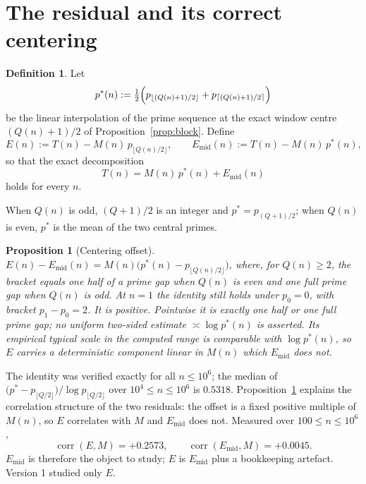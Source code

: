 \documentclass[11pt]{amsart}
\numberwithin{equation}{section}
\theoremstyle{plain}
\newtheorem{proposition}[theorem]{Proposition}
\theoremstyle{definition}
\newtheorem{definition}[theorem]{Definition}
\theoremstyle{remark}
\newcommand{\Mert}{M}
\newcommand{\Sq}{Q}
\begin{document}
\section{The residual and its correct centering}
\label{sec:centering}

\begin{definition}
\label{def:residuals}
Let
\begin{equation}
\label{eq:pstar-definition}
p^{*}(n):=\tfrac12\Bigl(p_{\lfloor (\Sq(n)+1)/2\rfloor}+p_{\lceil (\Sq(n)+1)/2\rceil}\Bigr)
\end{equation}
be the linear interpolation of the prime sequence at the exact window centre
$(\Sq(n)+1)/2$ of Proposition~\ref{prop:block}. Define
\begin{equation}
\label{eq:residual-definitions}
E(n):=T(n)-\Mert(n)\,p_{\lfloor \Sq(n)/2\rfloor},
\qquad
E_{\mathrm{mid}}(n):=T(n)-\Mert(n)\,p^{*}(n),
\end{equation}
so that the exact decomposition
\begin{equation}
\label{eq:centered-decomposition}
\boxed{\;T(n)=\Mert(n)\,p^{*}(n)+E_{\mathrm{mid}}(n)\;}
\end{equation}
holds for every $n$.
\end{definition}

When $\Sq(n)$ is odd, $(\Sq+1)/2$ is an integer and $p^{*}=p_{(\Sq+1)/2}$; when
$\Sq(n)$ is even, $p^{*}$ is the mean of the two central primes.

\begin{proposition}[Centering offset]\label{prop:offset}
$E(n)-E_{\mathrm{mid}}(n)=\Mert(n)\bigl(p^{*}(n)-p_{\lfloor \Sq(n)/2\rfloor}\bigr)$,
where, for $\Sq(n)\ge2$, the bracket equals one half of a prime gap when
$\Sq(n)$ is even and one full prime gap when $\Sq(n)$ is odd. At $n=1$ the
identity still holds under $p_0=0$, with bracket $p_1-p_0=2$. It is positive. Pointwise it is exactly one half or one full prime gap; no
uniform two-sided estimate $\asymp\log p^{*}(n)$ is asserted. Its empirical
typical scale in the computed range is comparable with $\log p^{*}(n)$, so $E$
carries a deterministic component linear in $\Mert(n)$ which
$E_{\mathrm{mid}}$ does not.
\end{proposition}

The identity was verified exactly for all $n\le10^{6}$; the median of
$\bigl(p^{*}-p_{\lfloor \Sq/2\rfloor}\bigr)/\log p_{\lfloor \Sq/2\rfloor}$ over
$10^{4}\le n\le10^{6}$ is $0.5318$. Proposition~\ref{prop:offset} explains the
correlation structure of the two residuals: the offset is a fixed positive
multiple of $\Mert(n)$, so $E$ correlates with $\Mert$ and $E_{\mathrm{mid}}$
does not. Measured over $100\le n\le10^{6}$,
\begin{equation}
\label{eq:residual-correlations}
\operatorname{corr}(E,\Mert)=+0.2573,
\qquad
\operatorname{corr}(E_{\mathrm{mid}},\Mert)=+0.0045 .
\end{equation}
$E_{\mathrm{mid}}$ is therefore the object to study; $E$ is $E_{\mathrm{mid}}$
plus a bookkeeping artefact. Version 1 studied only $E$.
\end{document}
